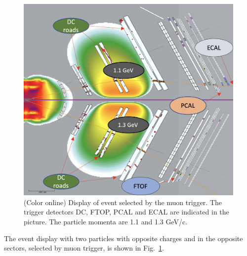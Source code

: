 \begin{figure}[!htb]
 	\centering
  	\includegraphics[width=0.95\columnwidth,keepaspectratio]{img/Muon_trigger.png}
 	\caption{(Color online) Display of event selected by the muon trigger. The trigger detectors DC, FTOP, PCAL and ECAL are indicated in the picture. The particle momenta are  1.1 and 1.3 GeV/c.}
	\label{fig:muon}
\end{figure}
\noindent
 The event display with  two particles with opposite charges and in the opposite sectors, selected by muon trigger, is shown in Fig.~\ref{fig:muon}.



